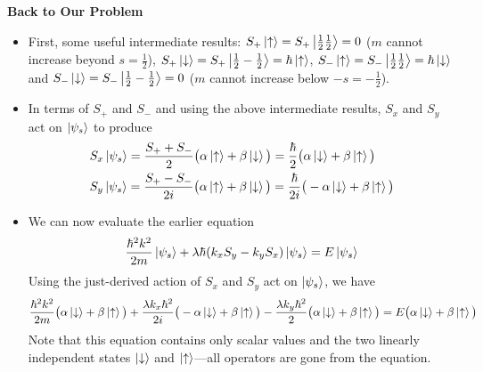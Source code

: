\documentclass[11pt, a4paper]{article}
\newcommand{\ua}{\uparrow}  %
\newcommand{\da}{\downarrow}  %
\begin{document}
\textbf{Back to Our Problem}
\begin{itemize}
	\item  First, some useful intermediate results: $ S_{+}\ket{\ua} = S_{+}\ket{\tfrac{1}{2} \tfrac{1}{2}} = 0 $ ($ m $ cannot increase beyond $ s = \frac{1}{2} $), $ S_{+}\ket{\da} = S_{+}\ket{\tfrac{1}{2} -\tfrac{1}{2}} = \hbar \ket{\ua} $, $ S_{-}\ket{\ua} = S_{-}\ket{\tfrac{1}{2} \tfrac{1}{2}} = \hbar \ket{\da} $ and $ S_{-}\ket{\da} = S_{-}\ket{\tfrac{1}{2}- \tfrac{1}{2}} = 0 $ ($ m $ cannot increase below $ -s = -\frac{1}{2} $). 

	\item In terms of $ S_{+} $ and $ S_{-} $ and using the above intermediate results, $ S_{x} $ and $ S_{y} $ act on $ \ket{\psi_{s}} $ to produce
	\begin{align*}
		&S_{x}\ket{\psi_{s}} = \frac{S_{+}+S_{-}}{2} \big(\alpha \ket{\ua} + \beta \ket{\da}\big) = \frac{\hbar}{2} \big(\alpha \ket{\da} + \beta \ket{\ua}\big)\\
		&S_{y}\ket{\psi_{s}} = \frac{S_{+}-S_{-}}{2i} \big(\alpha \ket{\ua} + \beta \ket{\da}\big) = \frac{\hbar}{2i} \big(-\alpha \ket{\da} + \beta \ket{\ua}\big)
	\end{align*} 
	
	\item We can now evaluate the earlier equation 
	\begin{equation*}
		\frac{\hbar^{2}k^{2}}{2m}\ket{\psi_{s}} + \lambda \hbar (k_{x}S_{y} - k_{y}S_{x})\ket{\psi_{s}} = E\ket{\psi_{s}}
	\end{equation*}
	Using the just-derived action of $ S_{x} $ and $ S_{y} $ act on $ \ket{\psi_{s}} $, we have
	\begin{equation*}
		\frac{\hbar^{2}k^{2}}{2m}\big(\alpha \ket{\da} + \beta \ket{\ua}\big)+ \frac{\lambda k_{x} \hbar^{2}}{2i} \big(-\alpha \ket{\da} + \beta \ket{\ua}\big) - \frac{\lambda k_{y} \hbar^{2}}{2} \big(\alpha \ket{\da} + \beta \ket{\ua}\big) = E\big(\alpha \ket{\da} + \beta \ket{\ua}\big)
	\end{equation*}
	Note that this equation contains only scalar values and the two linearly independent states $ \ket{\da} $ and $ \ket{\ua} $---all operators are gone from the equation. 
	

\end{itemize}
\end{document}
